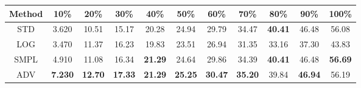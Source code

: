 \documentclass{standalone}
\begin{document}
\begin{tabular}{c|cccccccccc}
      \toprule
      Method & 10\% & 20\% & 30\% & 40\% & 50\% & 60\% & 70\% & 80\% & 90\% & 100\% \\
      \midrule
STD & 3.620 & 10.51 & 15.17 & 20.28 & 24.94 & 29.79 & 34.47 & \textbf{40.41} & 46.48 & 56.08\\
LOG & 3.470 & 11.37 & 16.23 & 19.83 & 23.51 & 26.94 & 31.35 & 33.16 & 37.30 & 43.83\\
SMPL & 4.910 & 11.08 & 16.34 & \textbf{21.29} & 24.64 & 29.86 & 34.39 & \textbf{40.41} & 46.48 & \textbf{56.69}\\
ADV & \textbf{7.230} & \textbf{12.70} & \textbf{17.33} & \textbf{21.29} & \textbf{25.25} & \textbf{30.47} & \textbf{35.20} & 39.84 & \textbf{46.94} & 56.19\\
  \bottomrule
\end{tabular}
\end{document}
